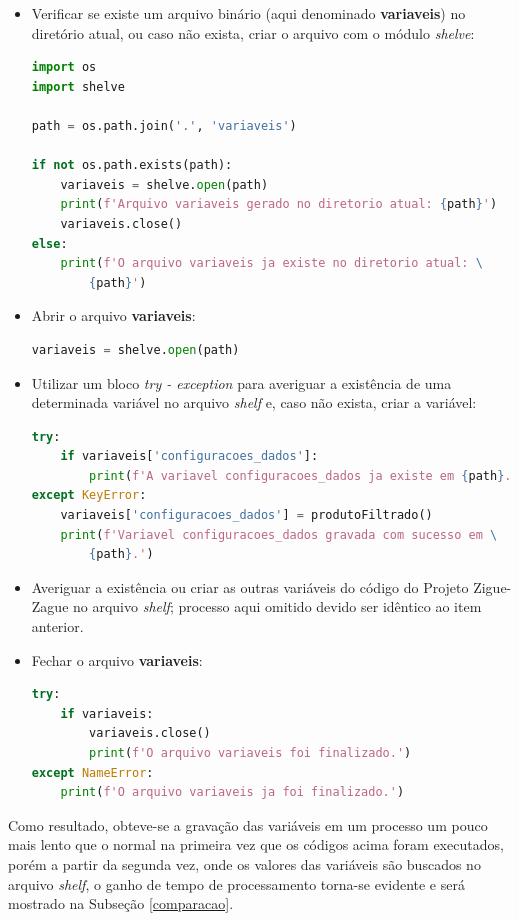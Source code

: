 \documentclass[12pt]{article}
\begin{document}
\begin{itemize}
	\item Verificar se existe um arquivo binário (aqui denominado \textbf{variaveis}) no diretório atual, ou caso não exista, criar o arquivo com o módulo \textit{shelve}:
\begin{lstlisting}[language=Python]
import os
import shelve

path = os.path.join('.', 'variaveis')

if not os.path.exists(path):
	variaveis = shelve.open(path)
	print(f'Arquivo variaveis gerado no diretorio atual: {path}')
	variaveis.close()
else:
	print(f'O arquivo variaveis ja existe no diretorio atual: \
		{path}')
\end{lstlisting}
	
	\item Abrir o arquivo \textbf{variaveis}:
\begin{lstlisting}[language=Python]
variaveis = shelve.open(path)
\end{lstlisting} 
	
	\item Utilizar um bloco \textit{try - exception} para averiguar a existência de uma determinada variável no arquivo \textit{shelf} e, caso não exista, criar a variável:
\begin{lstlisting}[language=Python]
try:
	if variaveis['configuracoes_dados']:
		print(f'A variavel configuracoes_dados ja existe em {path}.')
except KeyError:
	variaveis['configuracoes_dados'] = produtoFiltrado()
	print(f'Variavel configuracoes_dados gravada com sucesso em \
		{path}.')
\end{lstlisting}
	
	\item Averiguar a existência ou criar as outras variáveis do código do Projeto Zigue-Zague no arquivo \textit{shelf}; processo aqui omitido devido ser idêntico ao item anterior.
	
	\item Fechar o arquivo \textbf{variaveis}:
\begin{lstlisting}[language=Python]
try:
	if variaveis:
		variaveis.close()
		print(f'O arquivo variaveis foi finalizado.')
except NameError:
	print(f'O arquivo variaveis ja foi finalizado.')
\end{lstlisting}
\end{itemize}

Como resultado, obteve-se a gravação das variáveis em um processo um pouco mais lento que o normal na primeira vez que os códigos acima foram executados, porém a partir da segunda vez, onde os valores das variáveis são buscados no arquivo \textit{shelf}, o ganho de tempo de processamento torna-se evidente e será mostrado na Subseção \ref{comparacao}.
\end{document}
